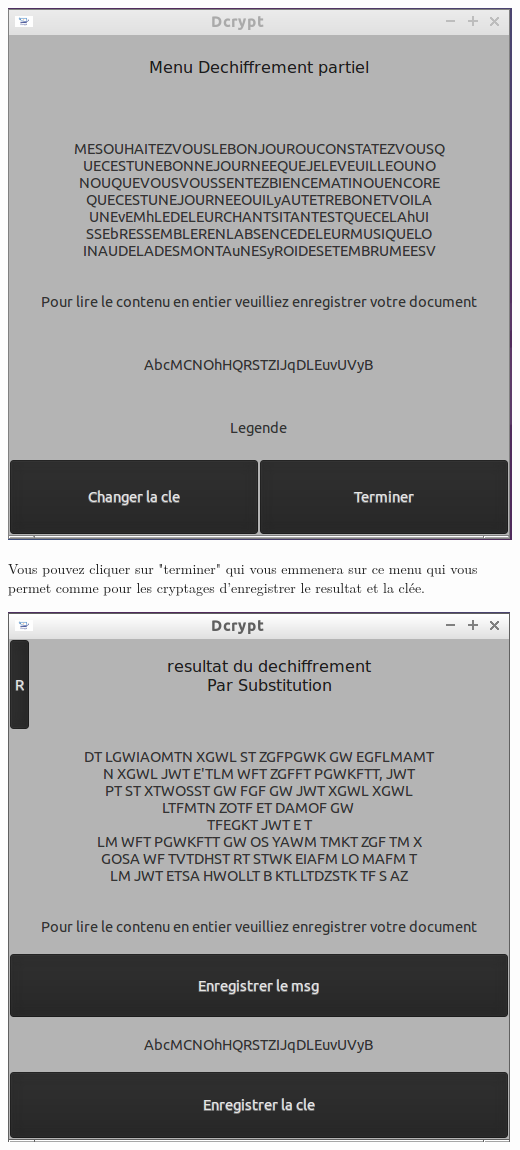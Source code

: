 \documentclass[a4]{article}
\begin{document}
			\begin{center}\includegraphics[scale=0.4]{11.png}\end{center}
			Vous pouvez cliquer sur "terminer" qui vous emmenera sur ce menu qui vous permet comme pour 
 			les cryptages d'enregistrer le resultat et la clée.
			\begin{center}\includegraphics[scale=0.4]{12.png}\end{center}
\end{document}
